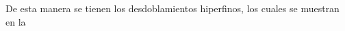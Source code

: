 \documentclass[../Main.tex]{subfiles}
\begin{document}
De esta manera se tienen los desdoblamientos hiperfinos, los cuales se muestran en la 
\end{document}
